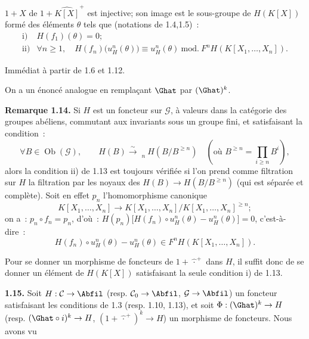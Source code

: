 \(1+X\) de \(1+\widehat{K[X]}^+\) est
injective; son image est le sous-groupe de \(H(K[X])\) formé des éléments \(\theta\) tels que (notations de 1.4,1.5)~:
\[
\begin{array}{ll}
\text{i)}& H(f_1)(\theta)=0;\\[0.3em]
\text{ii)}& \forall n\geq1,\quad
H(f_n)\bigl(u_H^n(\theta)\bigr)\equiv u_H^n(\theta)
\ \mathrm{mod.}\ F^nH(K[X_1,\ldots,X_n]).
\end{array}
\]

Immédiat à partir de 1.6 et 1.12.

On a un énoncé analogue en remplaçant \(\Ghat\) par \((\Ghat)^k\).

\textbf{Remarque 1.14.} Si \(H\) est un foncteur sur \(\mathcal G\), à valeurs dans la catégorie des groupes abéliens, commutant aux invariants sous un groupe fini, et satisfaisant la condition~:
\[
  \forall B\in\operatorname{Ob}(\mathcal G),\qquad
  H(B)\xrightarrow{\sim}\mathop{\underleftarrow{\mathrm{Lim}}}\limits_n H(B/B^{\geq n})\quad(\text{où }B^{\geq n}=\prod_{i\geq n}B^i),
\]
alors la condition ii) de 1.13 est toujours vérifiée si l'on prend comme filtration sur \(H\) la filtration par les noyaux des \(H(B)\longrightarrow H(B/B^{\geq n})\) (qui est séparée et complète). Soit en effet \(p_n\) l'homomorphisme canonique
\[
  K[X_1,\ldots,X_n]\longrightarrow K[X_1,\ldots,X_n]/K[X_1,\ldots,X_n]^{\geq n};
\]
on a~: \(p_n\circ f_n=p_n\), d'où~: \(H(p_n)\bigl[H(f_n)\circ u_H^n(\theta)-u_H^n(\theta)\bigr]=0\), c'est-à-dire~:
\[
  H(f_n)\circ u_H^n(\theta)-u_H^n(\theta)
  \in F^nH(K[X_1,\ldots,X_n]).
\]

Pour se donner un morphisme de foncteurs de \(1+\widehat{\,\cdot\,}^{+}\) dans \(H\), il suffit donc de se donner un élément de \(H(K[X])\) satisfaisant la seule condition i) de 1.13.

\textbf{1.15.} Soit \(H:\mathcal C\to\Abfil\) (resp. \(\mathcal C_0\to\Abfil\), \(\mathcal G\to\Abfil\)) un foncteur satisfaisant les conditions de 1.3 (resp. 1.10, 1.13), et soit \(\Phi:(\Ghat)^k\to H\) (resp. \((\Ghat\circ i)^k\to H\), \((1+\widehat{\,\cdot\,}^{+})^k\to H\)) un morphisme de foncteurs. Nous avons vu 
